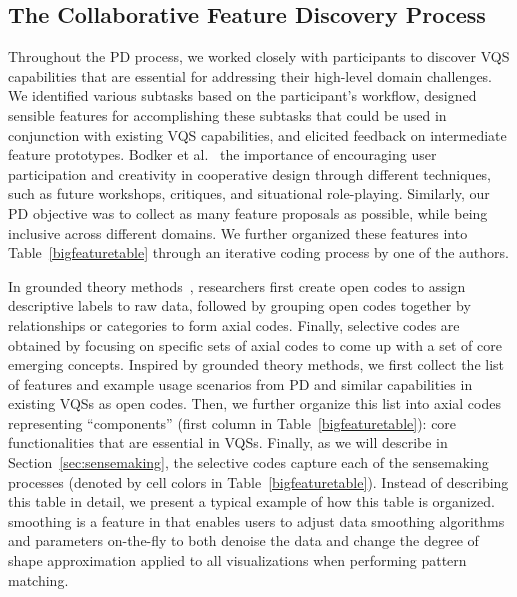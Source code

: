  \subsection{The Collaborative Feature Discovery Process~\label{sec:feature_dsicovery}}
 \par Throughout the PD process, we worked closely with participants to discover VQS capabilities that are essential for addressing their high-level domain challenges. We identified various subtasks based on the participant's workflow, designed sensible features for accomplishing these subtasks that could be used in conjunction with existing VQS capabilities, and elicited feedback on intermediate feature prototypes. Bodker et al.~\cite{BodkerGronbaek}  the importance of encouraging user participation and creativity in cooperative design through different techniques, such as future workshops, critiques, and situational role-playing. Similarly, our PD objective was to collect as many feature proposals as possible, while being inclusive across different domains. We further organized these features into Table~\ref{bigfeaturetable} through an iterative coding process by one of the authors.
 \par In grounded theory methods~\cite{Muller2012}, researchers first create open codes to assign descriptive labels to raw data, followed by grouping open codes together by relationships or categories to form axial codes. Finally, selective codes are obtained by focusing on specific sets of axial codes to come up with a set of core emerging concepts. Inspired by grounded theory methods, we first collect the list of features and example usage scenarios from PD and similar capabilities in existing VQSs as open codes. Then, we further organize this list into axial codes representing ``components'' (first column in Table~\ref{bigfeaturetable}): core functionalities that are essential in VQSs. Finally, as we will describe in Section~\ref{sec:sensemaking}, the selective codes capture each of the sensemaking processes (denoted by cell colors in Table~\ref{bigfeaturetable}). Instead of describing this table in detail, we present a typical example of how this table is organized.  smoothing is a feature in \zvpp that enables users to adjust data smoothing algorithms and parameters on-the-fly to both denoise the data and change the degree of shape approximation applied to all visualizations when performing pattern matching. %
